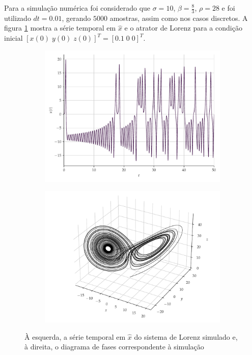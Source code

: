 \documentclass{article}
\begin{document}
Para a simulação numérica foi considerado que $\sigma = 10$, $\beta = \frac{8}{3}$, $\rho = 28$ e foi utilizado $dt = 0.01$, gerando $5000$ amostras, assim como nos casos discretos. A figura \ref{fig:lorenz} mostra a série temporal em $\hat{x}$ e o atrator de Lorenz para a condição inicial $[x(0)\; y(0)\; z(0)]^T = [0.1\; 0\; 0]^T$.
\begin{figure}[H]
     \begin{subfigure}[t]{0.2\textwidth} 
         \includegraphics[scale=0.2]{serie-lorenz-x.pdf}
     \end{subfigure}
     \centering
     \begin{subfigure}[t]{0.2\textwidth}
         \includegraphics[scale=0.2]{diagrama-de-fases-lorenz.pdf}
     \end{subfigure}
     \caption{À esquerda, a série temporal em $\hat{x}$ do sistema de Lorenz simulado e, à direita, o diagrama de fases correspondente à simulação}
     \label{fig:lorenz}
\end{figure}
\end{document}

